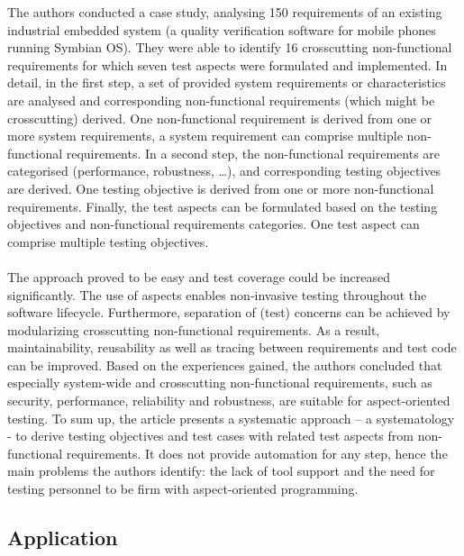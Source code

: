 The authors conducted a case study, analysing 150 requirements of an existing industrial embedded system (a quality verification software for mobile phones running Symbian OS). They were able to identify 16 crosscutting non-functional requirements for which seven test aspects were formulated and implemented. In detail, in the first step, a set of provided system requirements or characteristics are analysed and corresponding non-functional requirements (which might be crosscutting) derived. One non-functional requirement is derived from one or more system requirements, a system requirement can comprise multiple non-functional requirements. In a second step, the non-functional requirements are categorised (performance, robustness, …), and corresponding testing objectives are derived. One testing objective is derived from one or more non-functional requirements. Finally, the test aspects can be formulated based on the testing objectives and non-functional requirements categories. One test aspect can comprise multiple testing objectives.\\  
\\
The approach proved to be easy and test coverage could be increased significantly. The use of aspects enables non-invasive testing throughout the software lifecycle. Furthermore, separation of (test) concerns can be achieved by modularizing crosscutting non-functional requirements. As a result, maintainability, reusability as well as tracing between requirements and test code can be improved.  Based on the experiences gained, the authors concluded that especially system-wide and crosscutting non-functional requirements, such as security, performance, reliability and robustness, are suitable for aspect-oriented testing.
To sum up, the article presents a systematic approach – a systematology - to derive testing objectives and test cases with related test aspects from non-functional requirements. It does not provide automation for any step, hence the main problems the authors identify: the lack of tool support and the need for testing personnel to be firm with aspect-oriented programming.

\newpage
\subsection{Application}

